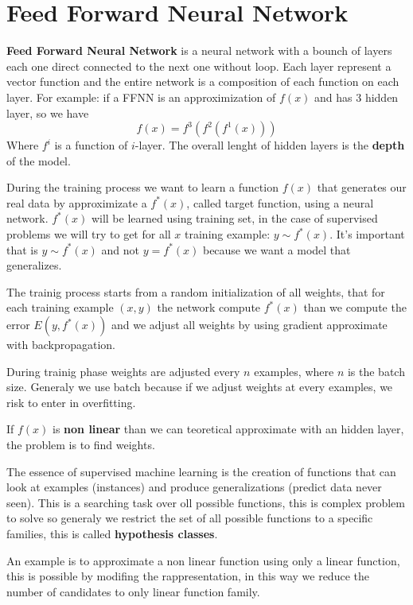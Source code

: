 \chapter{Feed Forward Neural Network}
\textbf{Feed Forward Neural Network} is a neural network with a bounch of layers 
each one direct connected to the next one without loop. Each layer represent
a vector function and the entire network is a composition of each function on each 
layer. For example: if a FFNN is an approximization of $f(x)$ and has $3$ hidden layer,
so we have 
$$f(x) = f^3(f^2(f^1(x)))$$
Where $f^i$ is a function of $i$-layer. The overall lenght of hidden layers is the \textbf{depth} of the model.

During the training process we want to learn a function $f(x)$ that generates our 
real data by approximizate a $f^*(x)$, called target function, using a neural network.   
$f^*(x)$ will be learned using training set, in the case of supervised problems
we will try to get for all $x$ training example: $y\sim f^*(x)$. It's important 
that is $y\sim f^*(x)$ and not $y=f^*(x)$ because we want a model that generalizes.

The trainig process starts from a random initialization of all weights, that for each 
training example $(x, y)$ the network compute $f^*(x)$ than we compute the error
$E(y, f^*(x))$ and we adjust all weights by using gradient approximate with 
backpropagation. 

\begin{nota}
During trainig phase weights are adjusted every $n$ examples, where $n$ is the batch 
size. Generaly we use batch because if we adjust weights at every examples, we risk 
to enter in overfitting.
\end{nota}

If $f(x)$ is \textbf{non linear} than we can teoretical approximate with an hidden 
layer, the problem is to find weights.

The essence of supervised machine learning is the creation of functions that 
can look at examples (instances) and produce generalizations (predict data never seen).
This is a searching task over oll possible functions, this is complex problem to solve
so generaly we restrict the set of all possible functions to a specific families,
this is called \textbf{hypothesis classes}. 

An example is to approximate a non linear function using only a linear function, 
this is possible by modifing the rappresentation, in this way we reduce the number 
of candidates to only linear function family.

